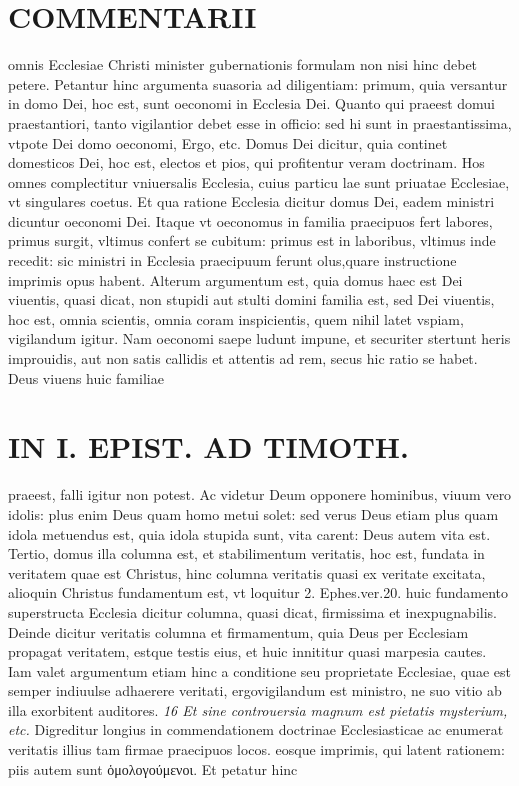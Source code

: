 \documentclass{article}
\begin{document}
\begin{pages}
\section*{COMMENTARII }
\marginpar{[ p.78 ]}\pstart omnis Ecclesiae Christi minister gubernationis formulam non nisi hinc debet petere. Petantur hinc argumenta suasoria ad diligentiam: primum, quia versantur in domo Dei, hoc est, sunt oeconomi in Ecclesia Dei. Quanto qui praeest domui praestantiori, tanto vigilantior debet esse in officio: sed hi sunt in praestantissima, vtpote Dei domo oeconomi, Ergo, etc. Domus Dei dicitur, quia continet domesticos Dei, hoc est, electos et pios, qui profitentur veram doctrinam. Hos omnes complectitur vniuersalis Ecclesia, cuius particu lae sunt priuatae Ecclesiae, vt singulares coetus. Et qua ratione Ecclesia dicitur domus Dei, eadem ministri dicuntur oeconomi Dei. Itaque vt oeconomus in familia praecipuos fert labores, primus surgit, vltimus confert se cubitum: primus est in laboribus, vltimus inde recedit: sic ministri in Ecclesia praecipuum ferunt olus,quare instructione imprimis opus habent.  \pend\pstart Alterum argumentum est, quia domus haec est Dei viuentis, quasi dicat, non stupidi aut stulti domini familia est, sed Dei viuentis, hoc est, omnia scientis, omnia coram inspicientis, quem nihil latet vspiam, vigilandum igitur. Nam oeconomi saepe ludunt impune, et securiter stertunt heris improuidis, aut non satis callidis et attentis ad rem, secus hic ratio se habet. Deus viuens huic familiae  \pend
\section*{IN I. EPIST. AD TIMOTH. }
\marginpar{[ p.79 ]}\pstart praeest, falli igitur non potest. Ac videtur Deum opponere hominibus, viuum vero idolis: plus enim Deus quam homo metui solet: sed verus Deus etiam plus quam idola metuendus est, quia idola stupida sunt, vita carent: Deus autem vita est.  \pend\pstart Tertio, domus illa columna est, et stabilimentum veritatis, hoc est, fundata in veritatem quae est Christus, hinc columna veritatis quasi ex veritate excitata, alioquin Christus fundamentum est, vt loquitur 2. Ephes.ver.20. huic fundamento superstructa Ecclesia dicitur columna, quasi dicat, firmissima et inexpugnabilis. Deinde dicitur veritatis columna et firmamentum, quia Deus per Ecclesiam propagat veritatem, estque testis eius, et huic innititur quasi marpesia cautes. Iam valet argumentum etiam hinc a conditione seu proprietate Ecclesiae, quae est semper indiuulse adhaerere veritati, ergovigilandum est ministro, ne suo vitio ab illa exorbitent auditores.  \pend
\textit{16 Et sine controuersia magnum est pietatis mysterium, etc. }\pstart Digreditur longius in commendationem doctrinae Ecclesiasticae ac enumerat veritatis illius tam firmae praecipuos locos. eosque imprimis, qui latent rationem: piis autem sunt ὁμολογούμενοι. Et petatur hinc  \pend

\end{pages}
\end{document}
